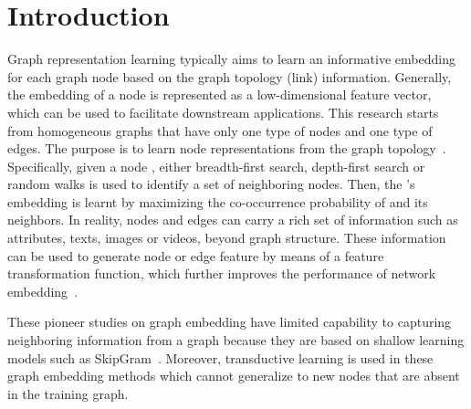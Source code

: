 \documentclass[sigconf]{acmart}
\begin{document}


\maketitle
\pagestyle{plain}

\section{Introduction}
\label{sec:intro}
Graph representation learning typically aims to learn an   informative embedding for each graph node based on the graph topology (link) information.
Generally, the embedding of a node is represented as a low-dimensional feature vector, which can be used to facilitate downstream applications.
This research starts from homogeneous graphs that have only one type of nodes and one type of edges. The purpose is to learn node representations from the graph topology~\cite{grover2016node2vec, perozzi2014deepwalk, dai2016discriminative}.
Specifically, given a node ,  either breadth-first search, depth-first search or random walks is used to identify a set of neighboring nodes. Then, the 's embedding is learnt by maximizing the co-occurrence probability of  and its neighbors.
In reality, nodes and edges can carry a rich set of information such as attributes, texts, images or videos, beyond graph structure.
These information can be used to generate node or edge feature by means of a feature transformation function, which  further improves the performance of network embedding~\cite{liao2018attributed}.

These pioneer studies on graph embedding have limited capability to capturing neighboring information from a graph because they are based on shallow learning models such as SkipGram~\cite{mikolov2013distributed}.
Moreover, transductive learning is used in these graph embedding methods which cannot generalize to new nodes that are absent in the training graph.
\end{document}
